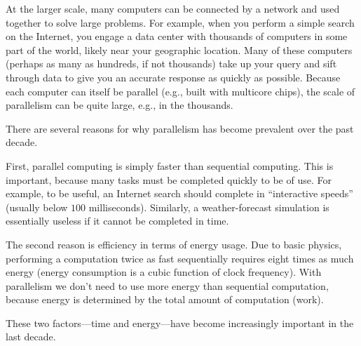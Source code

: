 \begin{cluster}
\label{grp:grm:introduction::parallelism::large-scale-parallelism}

\begin{gram}
\label{grm:introduction::parallelism::large-scale-parallelism}
At the larger scale, many computers can be connected by a network and
used together to solve large problems.  For example, when you perform
a simple search on the Internet, you engage a data center with
thousands of computers in some part of the world, likely near your
geographic location.
Many of these computers (perhaps as many as hundreds, if not
thousands) take up your query and sift through data to give you an
accurate response as quickly as possible.
Because each computer can itself be parallel (e.g., built with
multicore chips), the scale of parallelism can be quite large, e.g.,
in the thousands.

\end{gram}
\end{cluster}

\begin{cluster}
\label{grp:grm:introduction::parallelism::fundamental-reasons-for-why-parallelism-matters}

\begin{gram}
\label{grm:introduction::parallelism::fundamental-reasons-for-why-parallelism-matters}
There are several reasons for why parallelism has become prevalent
over the past decade.

First, parallel computing is simply faster than sequential computing.
This is important, because many tasks must be completed quickly to be
of use. 
For example, to be useful, an Internet search should complete in
``interactive speeds'' (usually below $100$ milliseconds).
Similarly, a weather-forecast simulation is essentially useless if it
cannot be completed in time.

The second reason is efficiency in terms of energy usage.
Due to basic physics, performing a computation twice as fast
sequentially requires eight times as much energy (energy consumption is a cubic function of clock frequency). 
With parallelism we don't need to use more energy than sequential
computation, because energy is determined by the total amount of
computation (work).

These two factors---time and energy---have become increasingly
important in the last decade.

\end{gram}
\end{cluster}

